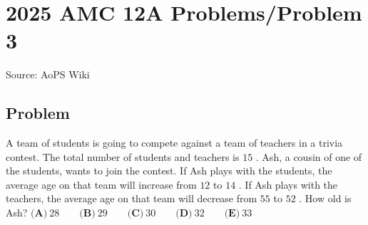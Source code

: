 \documentclass[12pt]{article}
\begin{document}
\section*{{2025 AMC 12A Problems/Problem 3}}
Source: AoPS Wiki

\subsection*{Problem}
A team of students is going to compete against a team of teachers in a trivia contest. The total number of students and teachers is $15$ . Ash, a cousin of one of the students, wants to join the contest. If Ash plays with the students, the average age on that team will increase from $12$ to $14$ . If Ash plays with the teachers, the average age on that team will decrease from $55$ to $52$ . How old is Ash? $\textbf{(A)}~28\qquad\textbf{(B)}~29\qquad\textbf{(C)}~30\qquad\textbf{(D)}~32\qquad\textbf{(E)}~33$
\end{document}
